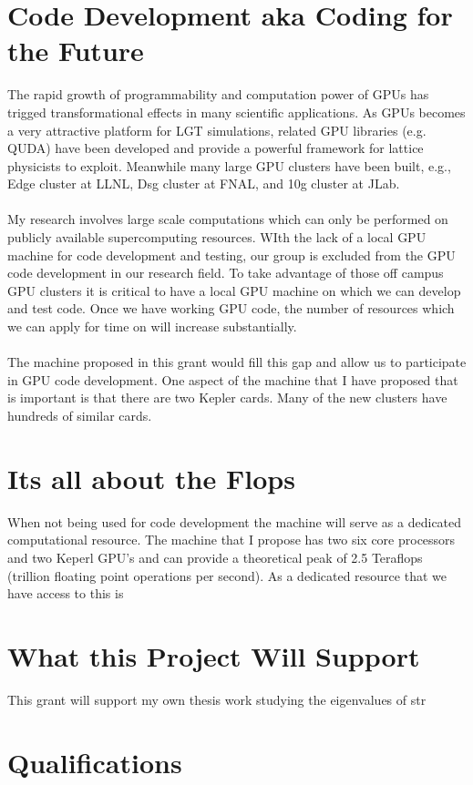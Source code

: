 \documentclass[11pt]{article}
\begin{document}
  \section*{Code Development aka Coding for the Future} %
 The rapid growth of programmability and computation power of GPUs has trigged transformational effects in many scientific applications. As GPUs becomes 
 a very attractive platform for LGT simulations, related GPU libraries (e.g. QUDA) have been developed and  
 provide a powerful framework for lattice physicists to exploit. Meanwhile many large GPU clusters have been built, e.g., Edge cluster at LLNL,
 Dsg cluster at FNAL, and 10g cluster at JLab.\\\\
 My research involves large scale computations which can only be performed on publicly available supercomputing resources. WIth the lack of a local GPU machine for code development and testing, our group is excluded from the GPU code development in our research field. 
 To take advantage of those off campus GPU clusters it is critical to have a local GPU machine on which we can develop and test code. 
 Once we have working GPU code, the number of resources which we can apply for time on will increase substantially.\\\\

 The machine proposed in this grant would fill this gap and allow us to participate in GPU code development.  One aspect of the machine that I have proposed that is important is that there are two Kepler cards.  Many of the new clusters have hundreds of similar cards.  
  
  \section*{Its all about the Flops} %
  When not being used for code development the machine will serve as a dedicated computational resource.  
  The machine that I propose has two six core processors and two Keperl GPU's and can provide a theoretical peak of 2.5 Teraflops (trillion floating point operations per second).  
  As a dedicated resource that we have access to this is

  \section*{What this Project Will Support} %
  This grant will support my own thesis work studying the eigenvalues of str

  \section*{Qualifications} %
\end{document}
